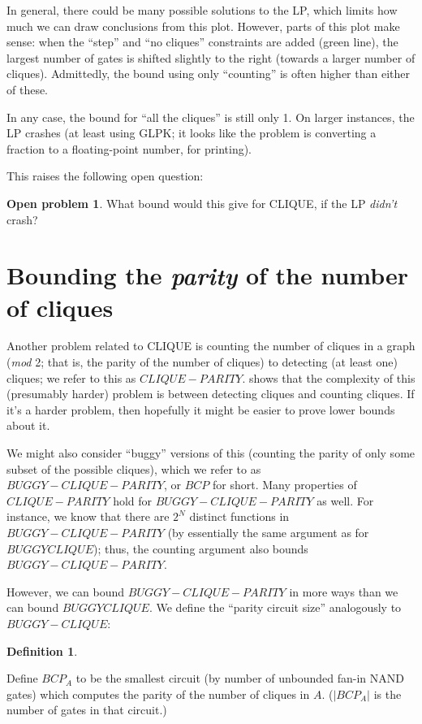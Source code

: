 \documentclass[12pt]{article}
\theoremstyle{definition}
\newtheorem{defn}{Definition}[section]
\newtheorem{prob}{Open problem}[section]
\begin{document}
In general, there could be many possible solutions to the LP, which
limits how much we can draw conclusions from this plot.  However,
parts of this plot make sense: when the ``step'' and ``no cliques''
constraints are added (green line), the largest number of gates is
shifted slightly to the right (towards a larger number of cliques).
Admittedly, the bound using only ``counting'' is often higher than
either of these.

In any case, the bound for ``all the cliques'' is still only 1.  On
larger instances, the LP crashes (at least using GLPK; it looks
like the problem is converting a fraction to a floating-point number,
for printing).

This raises the following open question:

\begin{prob}
What bound would this give for CLIQUE, if the LP {\em didn't} crash?
\end{prob}


\section{Bounding the {\em parity} of the number of cliques}

Another problem related to CLIQUE is 
counting the number of cliques in a graph ({\em mod} 2; that is, the parity
of the number of cliques) to
detecting (at least one) cliques; we refer to this as $CLIQUE-PARITY$.
\cite{goldreich2025counting} shows that the complexity of this (presumably harder)
problem is between detecting cliques and counting cliques. If it's a harder
problem, then hopefully it might be easier to prove lower bounds
about it.

We might also consider ``buggy'' versions of this (counting the parity of only
some subset of the possible cliques), which we refer to as $BUGGY-CLIQUE-PARITY$,
or $BCP$ for short.
Many properties of $CLIQUE-PARITY$ hold for $BUGGY-CLIQUE-PARITY$ as well.
For instance, we know that there are $2^N$ distinct functions
in $BUGGY-CLIQUE-PARITY$ (by essentially the same argument as for $BUGGYCLIQUE$);
thus, the counting argument also bounds $BUGGY-CLIQUE-PARITY$.

However, we can bound $BUGGY-CLIQUE-PARITY$ in more ways than we can bound $BUGGYCLIQUE$.
We define the ``parity circuit size'' analogously to $BUGGY-CLIQUE$:

\begin{defn} \label{defn:parityCircuitSize}

Define $BCP_A$ to be the smallest circuit (by number of unbounded fan-in NAND gates)
which computes the parity of the number of cliques in $A$.
($|BCP_A|$ is the number of gates in that circuit.)

\end{defn}
\end{document}
